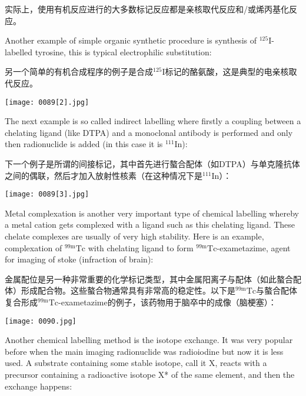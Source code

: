 \documentclass[dvipsnames, svgnames,a4paper,11pt]{article}
\begin{document}
实际上，使用有机反应进行的大多数标记反应都是亲核取代反应和/或烯丙基化反应。

Another example of simple organic synthetic procedure is synthesis of ${}^{125}\mathrm{I}$-labelled
tyrosine, this is typical electrophilic substitution:

另一个简单的有机合成程序的例子是合成${}^{125}\mathrm{I}$标记的酪氨酸，这是典型的电亲核取代反应。

\begin{figure*}[h]
    \centering
    \texttt{[image: 0089[2].jpg]}
\end{figure*}


The next example is so called indirect labelling where firstly a coupling between a
chelating ligand (like DTPA) and a monoclonal antibody is performed and only then
radionuclide is added (in this case it is ${}^{111}\mathrm{In}$):

下一个例子是所谓的间接标记，其中首先进行螯合配体（如DTPA）与单克隆抗体之间的偶联，然后才加入放射性核素（在这种情况下是${}^{111}\mathrm{In}$）：

\begin{figure*}[h]
    \centering
    \texttt{[image: 0089[3].jpg]}
\end{figure*}


Metal complexation is another very important type of chemical labelling whereby a
metal cation gets complexed with a ligand such as this chelating ligand. These
chelate complexes are usually of very high stability. Here is an example,
complexation of ${}^\mathrm{99m}\mathrm{Tc}$ with chelating ligand to form ${}^\mathrm{99m}\mathrm{Tc}$-exametazime, agent for
imaging of stoke (infraction of brain):

金属配位是另一种非常重要的化学标记类型，其中金属阳离子与配体（如此螯合配体）形成配合物。这些螯合物通常具有非常高的稳定性。以下是${}^\mathrm{99m}\mathrm{Tc}$与螯合配体复合形成${}^\mathrm{99m}\mathrm{Tc}$-exametazime的例子，该药物用于脑卒中的成像（脑梗塞）：

\begin{figure*}[h]
    \centering
    \texttt{[image: 0090.jpg]}
\end{figure*}


Another chemical labelling method is the isotope exchange. It was very popular
before when the main imaging radionuclide was radioiodine but now it is less used. A
substrate containing some stable isotope, call it X, reacts with a precursor containing
a radioactive isotope X* of the same element, and then the exchange happens:
\end{document}
